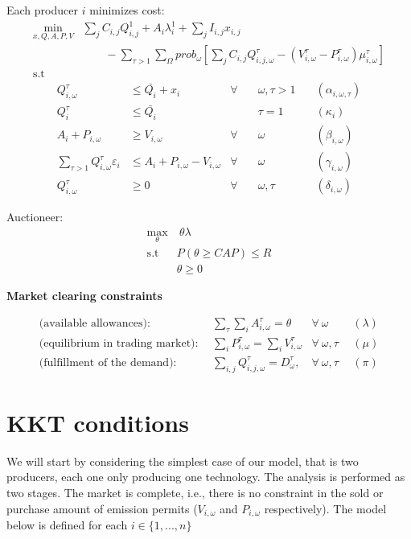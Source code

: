 \documentclass[11pt, letterpaper]{article}
\begin{document}
\begin{flushleft}
Each producer $i$ minimizes cost:
\begin{align}
    \min_{ x,Q,A,P,V} & \sum_{j}C_{i,j} Q^{1}_{i,j} + A_i\lambda^{1}_i + \sum_{j}I_{i,j}x_{i,j} \nonumber \\
     &\qquad - \sum_{\tau > 1} \sum_{\Omega}prob_\omega[\sum_j C_{i,j} Q^{\tau}_{i,j,\omega}  - (V^{\tau}_{i,\omega}-P^{\tau}_{i,\omega})\mu^{\tau}_{i,\omega}]\\
 \textrm{s.t \ } \nonumber
 \end{align}
 \begin{align}
    Q_{i,\omega}^{\tau} & \leq \bar{Q_i} + x_i & \forall & \quad \omega, \tau  > 1 & \quad (\alpha_{i,\omega,\tau})\\
    Q_{i}^{\tau} & \leq \bar{Q_i}  &  & \quad \tau  =1 & \quad (\kappa_i) \\
 A_{i} + P_{i,\omega} & \geq  V_{i,\omega} & \forall & \quad \omega & \quad (\beta_{i,\omega})\\
 \sum_{\tau>1}Q_{i, \omega}^{\tau}\varepsilon_{i} & \leq  A_{i} + P_{i,\omega} - V_{i,\omega}  &\forall & \quad \omega & \quad (\gamma_{i,\omega})\\
 Q_{i, \omega}^{\tau} & \geq  0   & \forall & \quad \omega, \tau & \quad (\delta_{i,\omega})
\end{align}

\smallskip
Auctioneer:
\begin{align}
    \max_{\theta} & \ \theta \lambda \\
    \textrm{s.t \ } & P(\theta \geq CAP) \leq R\\
    & \theta \geq 0
\end{align}

\smallskip

\textbf{Market clearing constraints}

\begin{align}
\textrm{(available allowances)}: &  \ \   \sum_{\tau} \sum_{i} A^{\tau}_{i,\omega} = \theta   & \forall \ \omega & \ \  (\lambda)\\
\textrm{(equilibrium in trading market)}: &   \ \  \sum_{i} P^{\tau}_{i,\omega} = \sum_{i} V^{\tau}_{i,\omega} & \forall \ \omega, \tau & \ \ (\mu) \\
\textrm{(fulfillment of the demand)}:  &   \ \  \sum_{i,j} Q^{\tau}_{i, j,\omega} = D^{\tau}_{\omega}, & \forall \ \omega, \tau & \ \ (\pi)
\end{align}

\end{flushleft}


\section{KKT conditions}
We will start by considering the simplest case of our model, that is two producers, each one only producing one technology. The analysis is performed as two stages. The market is complete, i.e., there is no constraint in the sold or purchase amount of emission permits ($V_{i,\omega}$ and  $P_{i,\omega}$ respectively). The model below is defined for each $i \in \{ 1,...,n\}$
\end{document}
